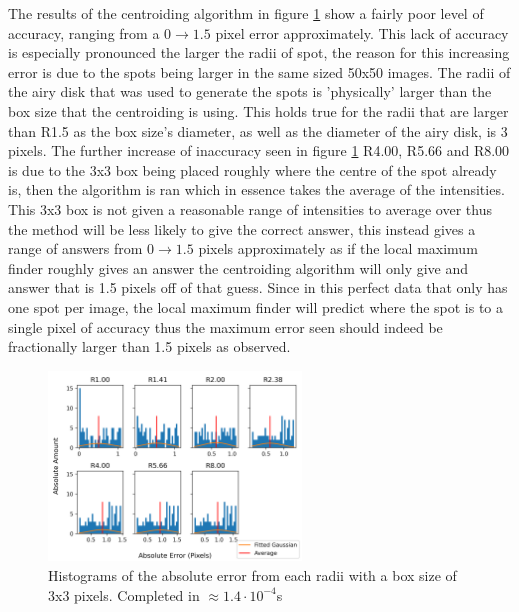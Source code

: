 \documentclass[aps,pra,a4paper,nofootinbib,onecolumn,tightenlines,longbibliography,12pt,amsfonts,amssymb,amsmath,floatfix]{revtex4-2} %
\begin{document}
  The results of the centroiding algorithm in figure \ref{fig:box_3} show a fairly poor 
  level of accuracy, ranging from a $0\rightarrow 1.5$ pixel error approximately. This lack of accuracy 
  is especially pronounced the larger the radii of spot, the reason for this increasing 
  error is due to the spots being larger in the same sized 50x50 images. The radii of the 
  airy disk that was used to generate the spots is 'physically' larger than the box size 
  that the centroiding is using. This holds true for the radii that are larger than R1.5 
  as the box size's diameter, as well as the diameter of the airy disk, is 3 pixels. The further 
  increase of inaccuracy seen in figure \ref{fig:box_3} R4.00, R5.66 and R8.00 is due to the 
  3x3 box being placed roughly where the centre of the spot already is, then the algorithm is 
  ran which in essence takes the average of the intensities. This 3x3 box is not given a reasonable 
  range of intensities to average over thus the method will be less likely to give the correct answer,
  this instead gives a range of answers from $0\rightarrow 1.5$ pixels approximately as if the 
  local maximum finder roughly gives an answer the centroiding algorithm will only give and answer 
  that is 1.5 pixels off of that guess. Since in this perfect data that only has one spot per image, the 
  local maximum finder will predict where the spot is to a single pixel of accuracy thus the maximum 
  error seen should indeed be fractionally larger than 1.5 pixels as observed.

  \begin{figure}[H]
    \begin{center}
      \includegraphics[width=0.6\textwidth]{project_pics/distro_centriod_3.png}
    \end{center}
    \caption{Histograms of the absolute error from each radii with a box size of 3x3 pixels. Completed in $\approx 1.4\cdot 10^{-4}$s}
    \label{fig:box_3}
  \end{figure}
\end{document}
